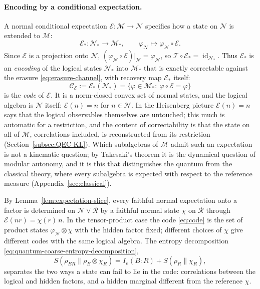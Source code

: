\documentclass[a4paper,11pt]{article}
\theoremstyle{definition}
\newcommand{\mR}{\mathcal{R}}
\newcommand{\mN}{\mathcal{N}}
\newcommand{\mM}{\mathcal{M}}
\newcommand{\mE}{\mathcal{E}}
\begin{document}
\paragraph{Encoding by a conditional expectation.}
A normal conditional expectation $\mE:\mM\to\mN$ specifies how a state on $\mN$ is extended to $\mM$:
\begin{equation}
 \mE_*:\mN_*\to\mM_*,\qquad \varphi_{\mN}\mapsto\varphi_{\mN}\circ\mE .
 \label{eq:encoding}
\end{equation}
Since $\mE$ is a projection onto $\mN$, $(\varphi_{\mN}\circ\mE)|_{\mN}=\varphi_{\mN}$, so $\mathcal T\circ\mE_*=\operatorname{id}_{\mN_*}$. Thus $\mE_*$ is an \emph{encoding} of the logical states $\mN_*$ into $\mM_*$ that is exactly correctable against the erasure \eqref{eq:erasure-channel}, with recovery map $\mE_*$ itself:
\begin{equation}
 \mathcal C_{\mE}:=\mE_*(\mN_*)=\{\varphi\in\mM_*:\ \varphi\circ\mE=\varphi\}
 \label{eq:code}
\end{equation}
is the \emph{code} of $\mE$. It is a norm-closed convex set of normal states, and the logical algebra is $\mN$ itself: $\mE(n)=n$ for $n\in\mN$. In the Heisenberg picture $\mE(n)=n$ says that the logical observables themselves are untouched; this much is automatic for a restriction, and the content of correctability is that the state on all of $\mM$, correlations included, is reconstructed from its restriction (Section~\ref{subsec:QEC-KL}). Which subalgebras of $\mM$ admit such an expectation is not a kinematic question; by Takesaki's theorem it is the dynamical question of modular autonomy, and it is this that distinguishes the quantum from the classical theory, where every subalgebra is expected with respect to the reference measure (Appendix~\ref{sec:classical}).

By Lemma~\ref{lem:expectation-slice}, every faithful normal expectation onto a factor is determined on $\mN\vee\mR$ by a faithful normal state $\chi$ on $\mR$ through $\mE(nr)=\chi(r)\,n$. In the tensor-product case the code \eqref{eq:code} is the set of product states $\varphi_{\mN}\otimes\chi$ with the hidden factor fixed; different choices of $\chi$ give different codes with the same logical algebra. The entropy decomposition \eqref{eq:quantum-coarse-entropy-decomposition},
\[
 S(\rho_{BR}\|\rho_B\otimes\chi_R)=I_\rho(B:R)+S(\rho_R\|\chi_R),
\]
separates the two ways a state can fail to lie in the code: correlations between the logical and hidden factors, and a hidden marginal different from the reference $\chi$.
\end{document}
